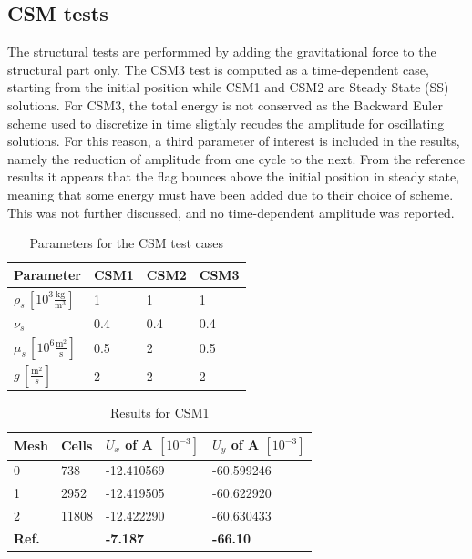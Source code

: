 \subsection{CSM tests}
The structural tests are performmed by adding the gravitational force to the structural part only. The CSM3 test is computed as a time-dependent case, starting from the initial position while CSM1 and CSM2 are Steady State (SS) solutions. For CSM3, the total energy is not conserved as the Backward Euler scheme used to discretize in time sligthly recudes the amplitude for oscillating solutions. For this reason, a third parameter of interest is included in the results, namely the reduction of amplitude from one cycle to the next. From the reference results it appears that the flag bounces above the initial position in steady state, meaning that some energy must have been added due to their choice of scheme. This was not further discussed, and no time-dependent amplitude was reported.  
\begin{table}[!ht]
\begin{center}
  \begin{tabular}{|l | l | l | l|} \hline
	Parameter & CSM1 & CSM2 & CSM3 \\ \hline
    $\rho_s\, [10^3\frac{\text{kg}}{\text{m}^3}]$  & 1 & 1 & 1 \\   \hline
    $\nu_s $ & 0.4 & 0.4 & 0.4 \\ \hline
    $\mu_s \,[10^{6}\frac{\text{m}^2}{\text{s}}]$ & 0.5 & 2 & 0.5   \\ \hline
    $g \, [\frac{\text{m}^2}{s}]$ & 2 & 2 & 2 \\ \hline
    \hline
  \end{tabular}
\end{center}
\caption{Parameters for the CSM test cases}
\end{table}

\begin{table}[!h]
\begin{center}
  \begin{tabular}{|l | l | l | l|} \hline
	Mesh & Cells & $U_x$ of A $[10^{-3}]$ & $U_y$ of A $[10^{-3}]$\\ \hline
    0  & 738 & -12.410569 & -60.599246 \\   \hline
    1 & 2952 & -12.419505 & -60.622920 \\ \hline
    2 & 11808 & -12.422290 & -60.630433   \\ \hline \hline
    \textbf{Ref.}  & & \textbf{-7.187} & \textbf{-66.10} \\ \hline 
    \hline
  \end{tabular}
\end{center}
\caption{Results for CSM1}
\end{table}

